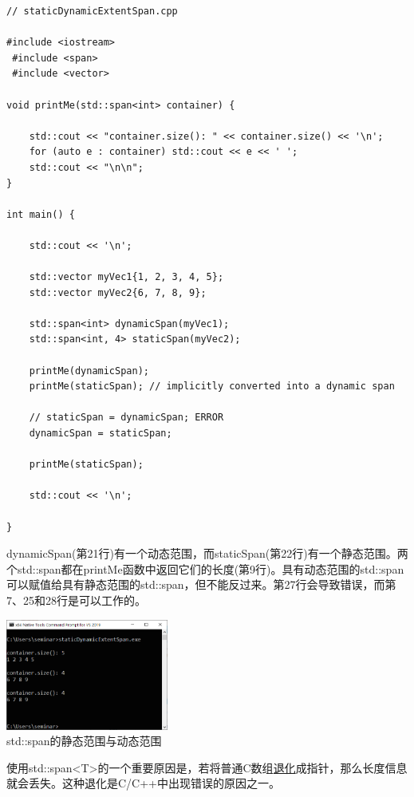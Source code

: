 \begin{lstlisting}[style=styleCXX]
// staticDynamicExtentSpan.cpp

#include <iostream>
 #include <span>
 #include <vector>

void printMe(std::span<int> container) {
	
	std::cout << "container.size(): " << container.size() << '\n';
	for (auto e : container) std::cout << e << ' ';
	std::cout << "\n\n";
}

int main() {

	std::cout << '\n';
	
	std::vector myVec1{1, 2, 3, 4, 5};
	std::vector myVec2{6, 7, 8, 9};
	
	std::span<int> dynamicSpan(myVec1);
	std::span<int, 4> staticSpan(myVec2);
	
	printMe(dynamicSpan);
	printMe(staticSpan); // implicitly converted into a dynamic span
	
	// staticSpan = dynamicSpan; ERROR
	dynamicSpan = staticSpan;
	
	printMe(staticSpan);
	
	std::cout << '\n';

}
\end{lstlisting}

dynamicSpan(第21行)有一个动态范围，而staticSpan(第22行)有一个静态范围。两个std::span都在printMe函数中返回它们的长度(第9行)。具有动态范围的std::span可以赋值给具有静态范围的std::span，但不能反过来。第27行会导致错误，而第7、25和28行是可以工作的。

\begin{center}
\includegraphics[width=0.4\textwidth]{content/3/chapter5/images/4.png}\\
std::span的静态范围与动态范围
\end{center}

使用std::span<T>的一个重要原因是，若将普通C数组\href{https://en.cppreference.com/w/cpp/types/decay}{退化}成指针，那么长度信息就会丢失。这种退化是C/C++中出现错误的原因之一。


